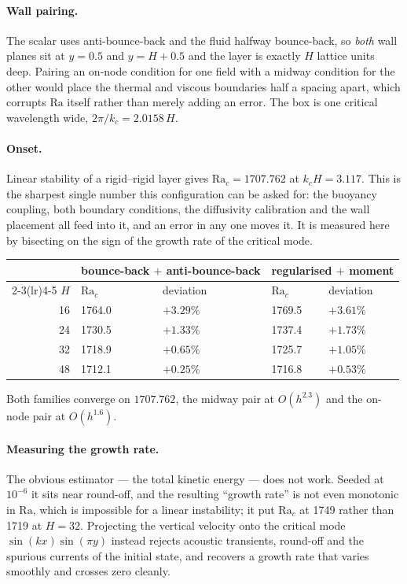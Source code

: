 \documentclass[11pt,a4paper]{article}
\begin{document}
\paragraph{Wall pairing.} The scalar uses anti-bounce-back and the fluid halfway
bounce-back, so \emph{both} wall planes sit at $y=0.5$ and $y=H+0.5$ and the
layer is exactly $H$ lattice units deep. Pairing an on-node condition for one
field with a midway condition for the other would place the thermal and viscous
boundaries half a spacing apart, which corrupts $\mathrm{Ra}$ itself rather than
merely adding an error. The box is one critical wavelength wide,
$2\pi/k_c = 2.0158\,H$.

\paragraph{Onset.} Linear stability of a rigid--rigid layer gives
$\mathrm{Ra}_c = 1707.762$ at $k_cH = 3.117$. This is the sharpest single number
this configuration can be asked for: the buoyancy coupling, both boundary
conditions, the diffusivity calibration and the wall placement all feed into it,
and an error in any one moves it. It is measured here by bisecting on the sign of
the growth rate of the critical mode.
\begin{center}\small
\begin{tabular}{rllll}
\toprule
& \multicolumn{2}{c}{bounce-back $+$ anti-bounce-back} & \multicolumn{2}{c}{regularised $+$ moment} \\
\cmidrule(lr){2-3}\cmidrule(lr){4-5}
$H$ & $\mathrm{Ra}_c$ & deviation & $\mathrm{Ra}_c$ & deviation \\
\midrule
16 & 1764.0 & $+3.29\%$ & 1769.5 & $+3.61\%$ \\
24 & 1730.5 & $+1.33\%$ & 1737.4 & $+1.73\%$ \\
32 & 1718.9 & $+0.65\%$ & 1725.7 & $+1.05\%$ \\
48 & 1712.1 & $\bm{+0.25\%}$ & 1716.8 & $+0.53\%$ \\
\bottomrule
\end{tabular}
\end{center}
\noindent Both families converge on $1707.762$, the midway pair at
$O(h^{2.3})$ and the on-node pair at $O(h^{1.6})$.

\paragraph{Measuring the growth rate.} The obvious estimator --- the total
kinetic energy --- does not work. Seeded at $10^{-6}$ it sits near round-off, and
the resulting ``growth rate'' is not even monotonic in $\mathrm{Ra}$, which is
impossible for a linear instability; it put $\mathrm{Ra}_c$ at 1749 rather than
1719 at $H=32$. Projecting the vertical velocity onto the critical mode
$\sin(kx)\sin(\pi y)$ instead rejects acoustic transients, round-off and the
spurious currents of the initial state, and recovers a growth rate that varies
smoothly and crosses zero cleanly.
\end{document}
